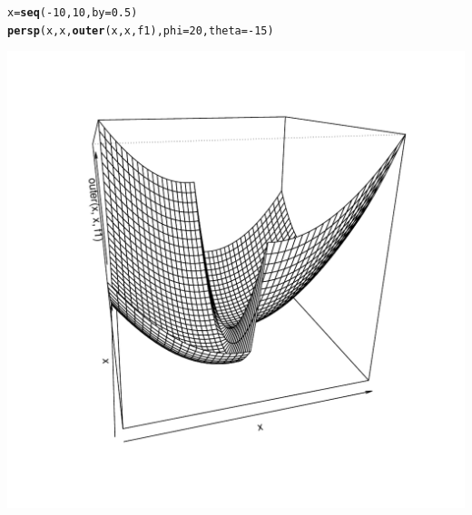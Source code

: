 \documentclass[11pt]{article}\usepackage[]{graphicx}\usepackage[]{color}
\makeatletter
\def\maxwidth{ %
  \ifdim\Gin@nat@width>\linewidth
    \linewidth
  \else
    \Gin@nat@width
  \fi
}
\newcommand{\hlnum}[1]{\textcolor[rgb]{0.686,0.059,0.569}{#1}}%
\newcommand{\hlopt}[1]{\textcolor[rgb]{0,0,0}{#1}}%
\newcommand{\hlstd}[1]{\textcolor[rgb]{0.345,0.345,0.345}{#1}}%
\newcommand{\hlkwb}[1]{\textcolor[rgb]{0.69,0.353,0.396}{#1}}%
\newcommand{\hlkwc}[1]{\textcolor[rgb]{0.333,0.667,0.333}{#1}}%
\newcommand{\hlkwd}[1]{\textcolor[rgb]{0.737,0.353,0.396}{\textbf{#1}}}%
\newenvironment{kframe}{%
 \def\at@end@of@kframe{}%
 \ifinner\ifhmode%
  \def\at@end@of@kframe{\end{minipage}}%
  \begin{minipage}{\columnwidth}%
 \fi\fi%
 \def\FrameCommand##1{\hskip\@totalleftmargin \hskip-\fboxsep
 \colorbox{shadecolor}{##1}\hskip-\fboxsep
     \hskip-\linewidth \hskip-\@totalleftmargin \hskip\columnwidth}%
 \MakeFramed {\advance\hsize-\width
   \@totalleftmargin\z@ \linewidth\hsize
   \@setminipage}}%
 {\par\unskip\endMakeFramed%
 \at@end@of@kframe}
\newenvironment{knitrout}{}{} %
\makeatother
\begin{document}
\begin{knitrout}
\color{fgcolor}\begin{kframe}
\begin{alltt}
\hlstd{x}\hlkwb{=}\hlkwd{seq}\hlstd{(}\hlopt{-}\hlnum{10}\hlstd{,}\hlnum{10}\hlstd{,}\hlkwc{by}\hlstd{=}\hlnum{0.5}\hlstd{)}
\hlkwd{persp}\hlstd{(x,x,}\hlkwd{outer}\hlstd{(x,x,f1),}\hlkwc{phi}\hlstd{=}\hlnum{20}\hlstd{,}\hlkwc{theta}\hlstd{=}\hlopt{-}\hlnum{15}\hlstd{)}
\end{alltt}
\end{kframe}
\includegraphics[width=\maxwidth]{figure/unnamed-chunk-16-1} 

\end{knitrout}
\end{document}
